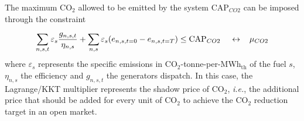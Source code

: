 \documentclass[3p]{elsarticle} %
\def\th{${}_{\textrm{th}}$}
\begin{document}
The maximum CO$_2$ allowed to be emitted by the system $\textrm{CAP}_{CO2}$ can be imposed through the constraint 

\begin{equation}
  \sum_{n,s,t}  \varepsilon_{s} \frac{ g_{n,s,t} }{\eta_{n,s}} + \sum_{n,s} \varepsilon_{s} (e_{n,s,t=0} - e_{n,s,t=T})  \leq  \textrm{CAP}_{CO2} \hspace{.4cm} \leftrightarrow \hspace{0.3cm} \mu_{CO2} \label{eq_co2cap}
\end{equation}
where $\varepsilon_{s}$ represents the specific emissions in CO$_2$-tonne-per-MWh\th{} of the fuel $s$, $\eta_{n,s}$ the efficiency and $g_{n,s,t}$ the generators dispatch. In this case, the Lagrange/KKT multiplier represents the shadow price of CO$_2$, \textit{i.e.}, the additional price that should be added for every unit of CO$_2$ to achieve the CO$_2$ reduction target in an open market. 
\end{document}
